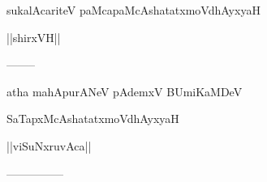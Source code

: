 \documentclass{article}
\begin{document}
\begin{center}
sukalAcariteV paMcapaMcAshatatxmoVdhAyxyaH
\end{center}

\begin{center}
||shirxVH||
\end{center}

\begin{center}
--------
\end{center}

\begin{center}
atha mahApurANeV pAdemxV BUmiKaMDeV
\end{center}

\begin{center}
SaTapxMcAshatatxmoVdhAyxyaH
\end{center}

\begin{center}
||viSuNxruvAca||
\end{center}

\begin{center}

---------------
\end{center}
\end{document}
